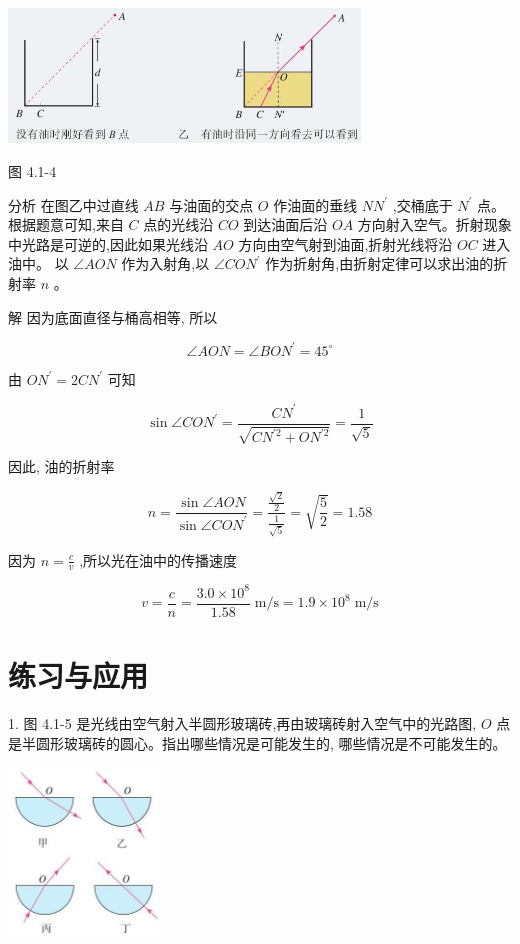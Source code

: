 \documentclass[10pt]{article}
\begin{document}
\begin{center}
\includegraphics[max width=0.7\textwidth]{images/01910e4c-ebb8-7d2c-8f2f-2375bc1d2d12_93_556528.jpg}
\end{center}

图 4.1-4

分析 在图乙中过直线 \({AB}\) 与油面的交点 \(O\) 作油面的垂线 \(N{N}^{\prime }\) ,交桶底于 \({N}^{\prime }\) 点。 根据题意可知,来自 \(C\) 点的光线沿 \({CO}\) 到达油面后沿 \({OA}\) 方向射入空气。折射现象中光路是可逆的,因此如果光线沿 \({AO}\) 方向由空气射到油面,折射光线将沿 \({OC}\) 进入油中。 以 \(\angle {AON}\) 作为入射角,以 \(\angle {CO}{N}^{\prime }\) 作为折射角,由折射定律可以求出油的折射率 \(n\) 。

解 因为底面直径与桶高相等, 所以

\[
\angle {AON} = \angle {BO}{N}^{\prime } = {45}^{ \circ }
\]

由 \(O{N}^{\prime } = {2C}{N}^{\prime }\) 可知

\[
\sin \angle {CO}{N}^{\prime } = \frac{C{N}^{\prime }}{\sqrt{C{N}^{\prime 2} + O{N}^{\prime 2}}} = \frac{1}{\sqrt{5}}
\]

因此, 油的折射率

\[
n = \frac{\sin \angle {AON}}{\sin \angle {CO}{N}^{\prime }} = \frac{\frac{\sqrt{2}}{2}}{\frac{1}{\sqrt{5}}} = \sqrt{\frac{5}{2}} = {1.58}
\]

因为 \(n = \frac{c}{v}\) ,所以光在油中的传播速度

\[
v = \frac{c}{n} = \frac{{3.0} \times {10}^{8}}{1.58}\mathrm{\;m}/\mathrm{s} = {1.9} \times {10}^{8}\mathrm{\;m}/\mathrm{s}
\]

\section*{练习与应用}

1. 图 4.1-5 是光线由空气射入半圆形玻璃砖,再由玻璃砖射入空气中的光路图, \(O\) 点是半圆形玻璃砖的圆心。指出哪些情况是可能发生的, 哪些情况是不可能发生的。

\begin{center}
\includegraphics[max width=0.3\textwidth]{images/01910e4c-ebb8-7d2c-8f2f-2375bc1d2d12_94_444329.jpg}
\end{center}
\end{document}
